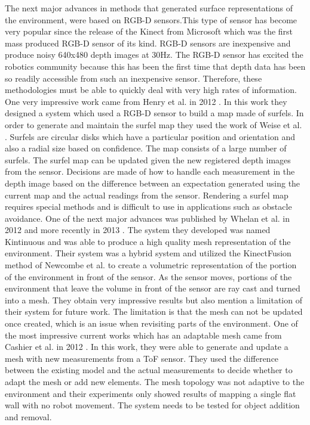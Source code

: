 \documentclass[12pt]{article}
\begin{document}
The next major advances in methods that generated surface representations
of the environment, were based on RGB-D sensors.This type of sensor has
become very popular since the release of the Kinect from Microsoft which
was the first mass produced RGB-D sensor of its kind. RGB-D sensors are
inexpensive and produce noisy 640x480 depth images at 30Hz. The RGB-D
sensor has excited the robotics community because this has been the first
time that depth data has been so readily accessible from such an
inexpensive sensor. Therefore, these methodologies must be able to quickly
deal with very high rates of information. One very impressive work came
from Henry et al. in 2012 \cite{Henry2012}. In this work they designed a
system which used a RGB-D sensor to build a map made of surfels. In order to
generate and maintain the surfel map they used the work of Weise et al.
\cite{Weise2009}. Surfels are circular disks which have a particular
position and orientation and also a radial size based on confidence. The
map consists of a large number of surfels. The surfel map can be updated
given the new registered depth images from the sensor. Decisions are made
of how to handle each measurement in the depth image based on the
difference between an expectation generated using the current map and the
actual readings from the sensor. Rendering a surfel map requires special
methods \cite{Pfister2000} and is difficult to use in applications such as
obstacle avoidance. One of the next major advances was published by Whelan
et al. in 2012 \cite{Whelan2012} and more recently in 2013
\cite{Whelan12tr}. The system they developed was named Kintinuous and was
able to produce a high quality mesh representation of the environment.
Their system was a hybrid system and utilized the KinectFusion method
\cite{Newcombe2011a} of Newcombe et al. to create a volumetric
representation of the portion of the environment in front of the sensor. As
the sensor moves, portions of the environment that leave the volume in
front of the sensor are ray cast and turned into a mesh. They obtain very
impressive results but also mention a limitation of their system for future
work. The limitation is that the mesh can not be updated once created,
which is an issue when revisiting parts of the environment. One of the most
impressive current works which has an adaptable mesh came from Cashier et
al. in 2012 \cite{Cahier2012}. In this work, they were able to generate and
update a mesh with new measurements from a ToF sensor. They used the
difference between the existing model and the actual measurements to decide
whether to adapt the mesh or add new elements. The mesh topology was not
adaptive to the environment and their experiments only showed results of mapping a
single flat wall with no robot movement. The system needs to be tested for
object addition and removal.  
\end{document}
